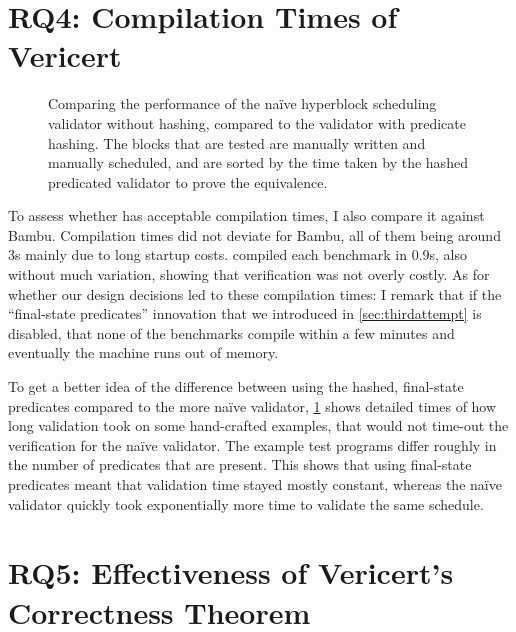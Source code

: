 \section{RQ4: Compilation Times of Vericert}

\begin{figure}
  \centering
  \resizebox{\linewidth}{!}{}
  \caption[Comparing the performance of predicate validators.]{Comparing the
    performance of the na\"ive hyperblock scheduling validator without hashing,
    compared to the validator with predicate hashing.  The blocks that are
    tested are manually written and manually scheduled, and are sorted by the
    time taken by the hashed predicated validator to prove the equivalence.}%
  \label{fig:eval:comparison-hashing}
\end{figure}

To assess whether \VericertHyper{} has acceptable compilation times, I also
compare it against Bambu.  Compilation times did not deviate for Bambu, all of
them being around 3s mainly due to long startup costs. \VericertHyper{} compiled
each benchmark in 0.9s, also without much variation, showing that verification
was not overly costly.  As for whether our design decisions led to these
compilation times: I remark that if the \enquote{final-state predicates}
innovation that we introduced in \cref{sec:thirdattempt} is disabled, that none
of the benchmarks compile within a few minutes and eventually the machine runs
out of memory.

To get a better idea of the difference between using the hashed, final-state
predicates compared to the more naïve validator,
\cref{fig:eval:comparison-hashing} shows detailed times of how long validation
took on some hand-crafted examples, that would not time-out the verification for
the naïve validator.  The example test programs differ roughly in the number of
predicates that are present.  This shows that using final-state predicates meant
that validation time stayed mostly constant, whereas the naïve validator quickly
took exponentially more time to validate the same schedule.

\section{RQ5: Effectiveness of Vericert's Correctness Theorem}

